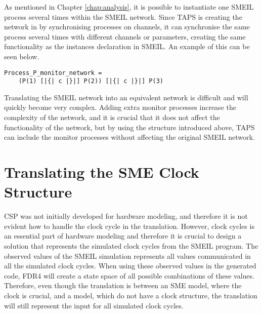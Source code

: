 As mentioned in Chapter \ref{chap:analysis}, it is possible to instantiate one SMEIL process several times within the SMEIL network. Since TAPS is creating the network in \cspm{} by synchronising processes on channels, it can synchronise the same process several times with different channels or parameters, creating the same functionality as the instances declaration in SMEIL. An example of this can be seen below.\\ \begin{verbatim}
Process_P_monitor_network =
    (P(1) [|{| c |}|] P(2)) [|{| c |}|] P(3)
\end{verbatim}

Translating the SMEIL network into an equivalent \cspm{} network is difficult and will quickly become very complex. Adding extra monitor processes increase the complexity of the network, and it is crucial that it does not affect the functionality of the network, but by using the structure introduced above, TAPS can include the monitor processes without affecting the original SMEIL network.


\section{Translating the SME Clock Structure}
CSP was not initially developed for hardware modeling, and therefore it is not evident how to handle the clock cycle in the translation. However, clock cycles is an essential part of hardware modeling and therefore it is crucial to design a solution that represents the simulated clock cycles from the SMEIL program. The observed values of the SMEIL simulation represents all values communicated in all the simulated clock cycles.
When using these observed values in the generated \cspm{} code, FDR4 will create a state space of all possible combinations of these values.
Therefore, even though the translation is between an SME model, where the clock is crucial, and a \cspm{} model, which do not have a clock structure, the translation will still represent the input for all simulated clock cycles.




